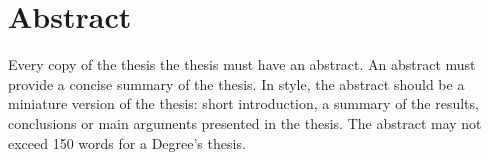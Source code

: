 \documentclass[a4paper,12pt]{article}
\begin{document}


\newpage
\tableofcontents

\newpage
\listoffigures
\lstlistoflistings
\listoftables

\newpage

\newpage
\section*{Abstract}
 {Every copy of the thesis the thesis must have an abstract. An abstract must provide a concise summary of the thesis. In style, the
  abstract should be a miniature version of the thesis: short introduction, a summary of the results, conclusions or main
  arguments presented in the thesis. The abstract may not exceed 150 words for a Degree’s thesis.}

\newpage




\newpage

\label{sec:introduction}


\label{sec:state}


\clearpage

\label{sec:methodology}

\clearpage

\label{sec:implementation}



\clearpage

\label{sec:budget}

\clearpage

\label{sec:conclusions}


\label{sec:futurework}




\newpage

\medskip



\end{document}
